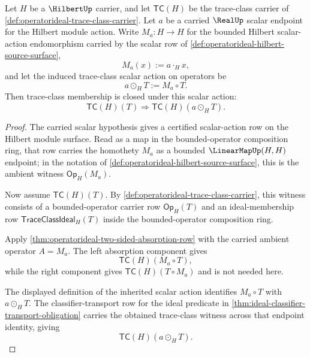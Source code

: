 \begin{theorem}
\label{thm:operatorideal-trace-class-scalar-closure}
Let $H$ be a $\HilbertUp$ carrier, and let $\mathsf{TC}(H)$ be the trace-class carrier of \autoref{def:operatorideal-trace-class-carrier}. Let $a$ be a carried $\RealUp$ scalar endpoint for the Hilbert module action. Write $M_a:H\to H$ for the bounded Hilbert scalar-action endomorphism carried by the scalar row of \autoref{def:operatorideal-hilbert-source-surface},
$$
M_a(x):=a\cdot_H x,
$$
and let the induced trace-class scalar action on operators be
$$
a\odot_H T:=M_a\circ T.
$$
Then trace-class membership is closed under this scalar action:
$$
\mathsf{TC}(H)(T)\Longrightarrow\mathsf{TC}(H)(a\odot_H T).
$$
\end{theorem}
\begin{proof}
The carried scalar hypothesis gives a certified scalar-action row on the Hilbert module surface. Read as a map in the bounded-operator composition ring, that row carries the homothety $M_a$ as a bounded $\LinearMapUp(H,H)$ endpoint; in the notation of \autoref{def:operatorideal-hilbert-source-surface}, this is the ambient witness $\mathsf{Op}_H(M_a)$.

Now assume $\mathsf{TC}(H)(T)$. By \autoref{def:operatorideal-trace-class-carrier}, this witness consists of a bounded-operator carrier row $\mathsf{Op}_H(T)$ and an ideal-membership row $\mathsf{TraceClassIdeal}_H(T)$ inside the bounded-operator composition ring.

Apply \autoref{thm:operatorideal-two-sided-absorption-row} with the carried ambient operator $A=M_a$. The left absorption component gives
$$
\mathsf{TC}(H)(M_a\circ T),
$$
while the right component gives $\mathsf{TC}(H)(T\circ M_a)$ and is not needed here.

The displayed definition of the inherited scalar action identifies $M_a\circ T$ with $a\odot_H T$. The classifier-transport row for the ideal predicate in \autoref{thm:ideal-classifier-transport-obligation} carries the obtained trace-class witness across that endpoint identity, giving
$$
\mathsf{TC}(H)(a\odot_H T).
$$
\end{proof}

